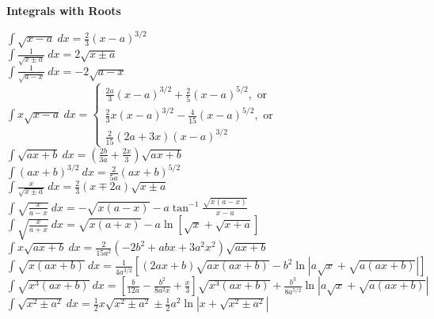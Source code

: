 \documentclass[10pt,landscape,a4paper]{article}
\begin{document}
\begin{multicols*}{3}
\textbf{Integrals with Roots}

$
\int \sqrt{x-a}\ dx = \frac{2}{3}(x-a)^{3/2}
$\\



$
\int \frac{1}{\sqrt{x\pm a}}\ dx = 2\sqrt{x\pm a} 
$\\

$\label{eq:Rigo}
\int \frac{1}{\sqrt{a-x}}\ dx = -2\sqrt{a-x} 
$\\


$\label{eq:Gilmore}
\int x\sqrt{x-a}\ dx =  
\left\{
\begin{array}{l}
\frac{2 a}{3} \left({x-a}\right)^{3/2} +\frac{2 }{5}\left( {x-a}\right)^{5/2},\text{ or} 
\\ \frac{2}{3} x(x-a)^{3/2} - \frac{4}{15} (x-a)^{5/2}, \text{ or}
\\ \frac{2}{15}(2a+3x)(x-a)^{3/2}
\end{array}
\right.
$\\

$
\int \sqrt{ax+b}\ dx = \left(\frac{2b}{3a}+\frac{2x}{3}\right)\sqrt{ax+b} 
$\\

$
\int (ax+b)^{3/2}\ dx =\frac{2}{5a}(ax+b)^{5/2}
$\\

$\label{eq:Weems}
\int \frac{x}{\sqrt{x\pm a} } \ dx = \frac{2}{3}(x\mp 2a)\sqrt{x\pm a}
$\\

$
\int \sqrt{\frac{x}{a-x}}\ dx =  -\sqrt{x(a-x)}
-a\tan^{-1}\frac{\sqrt{x(a-x)}}{x-a}
$\\

$
\int \sqrt{\frac{x}{a+x}}\ dx =  \sqrt{x(a+x)} 
-a\ln \left [ \sqrt{x} + \sqrt{x+a}\right] 
$\\

$
\int x \sqrt{ax + b}\ dx =
\frac{2}{15 a^2}(-2b^2+abx + 3 a^2 x^2)
\sqrt{ax+b}
$\\

$
\int \sqrt{x(ax+b)}\ dx = \frac{1}{4a^{3/2}}\left[(2ax + b)\sqrt{ax(ax+b)} 
-b^2 \ln \left| a\sqrt{x} + \sqrt{a(ax+b)} \right| \right ] 
$\\

$
\int \sqrt{x^3(ax+b)} \ dx =\left [ 
\frac{b}{12a}-
\frac{b^2}{8a^2x}+
\frac{x}{3}\right] 
\sqrt{x^3(ax+b)}  + 
\frac{b^3}{8a^{5/2}}\ln \left | a\sqrt{x} + \sqrt{a(ax+b)} \right |
$\\

$
\int\sqrt{x^2 \pm a^2}\ dx = \frac{1}{2}x\sqrt{x^2\pm a^2} 
\pm\frac{1}{2}a^2 \ln \left | x + \sqrt{x^2\pm a^2} \right | 
$\\


\end{multicols*}
\end{document}

